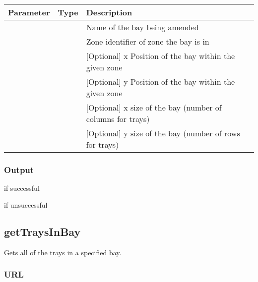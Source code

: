 \documentclass[letterpaper,10pt,english]{sphinxmanual}
\let\oldsubsection\subsection
\renewcommand{\subsection}{\needspace{6\baselineskip}\oldsubsection}
\begin{document}
\begin{savenotes}\sphinxattablestart
\centering
\begin{tabulary}{\linewidth}[t]{|T|T|T|}
\hline
\sphinxstyletheadfamily 
Parameter
&\sphinxstyletheadfamily 
Type
&\sphinxstyletheadfamily 
Description
\\
\hline
{}
&
&
Name of the bay being amended
\\
\hline
{}
&
&
Zone identifier of zone the bay is in
\\
\hline
{}
&
&
{[}Optional{]} x Position of the bay within the given zone
\\
\hline
{}
&
&
{[}Optional{]} y Position of the bay within the given zone
\\
\hline
{}
&
&
{[}Optional{]} x size of the bay (number of columns for trays)
\\
\hline
{}
&
&
{[}Optional{]} y size of the bay (number of rows for trays)
\\
\hline
\end{tabulary}
\par
\sphinxattableend\end{savenotes}


\subsubsection{Output}
\label{\detokenize{docs/Developer/editBay:output}}
 if successful

 if unsuccessful


\subsection{getTraysInBay}
\label{\detokenize{docs/Developer/getTraysInBay:gettraysinbay}}\label{\detokenize{docs/Developer/getTraysInBay::doc}}
Gets all of the trays in a specified bay.


\subsubsection{URL}
\label{\detokenize{docs/Developer/getTraysInBay:url}}
\end{document}
